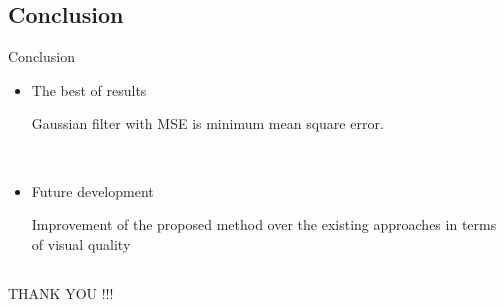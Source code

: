 \documentclass{beamer}
\begin{document}
\subsection{Conclusion}
\begin{frame}{Conclusion}
\begin{center}
\begin{itemize}
	\item The best of results
	
	 Gaussian filter with  MSE is minimum mean square error.

	
	\
    
    \item Future development
     
      Improvement of the proposed method over the existing approaches in terms of visual
     quality
\end{itemize}
\end{center}
 

\end{frame}



\subsection{}
\begin{frame}{}

\begin{center}
	\begin{LARGE}
		THANK YOU !!!
	\end{LARGE} 
\end{center}
\end{frame}
\end{document}
